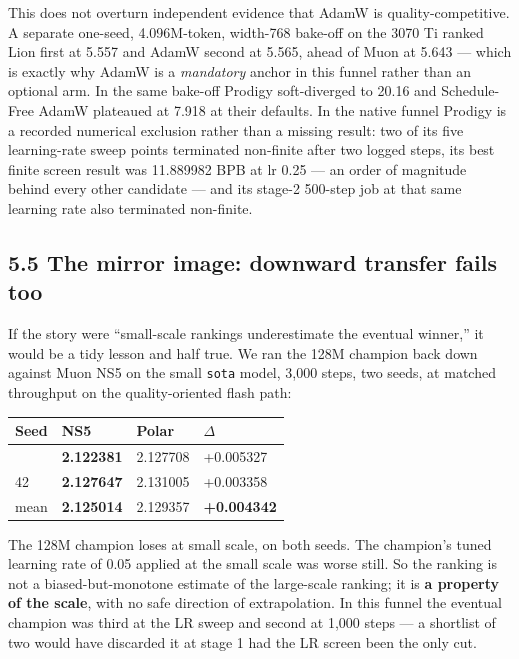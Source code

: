 This does not overturn independent evidence that AdamW is quality-competitive. A separate
one-seed, 4.096M-token, width-768 bake-off on the 3070 Ti ranked Lion first at 5.557 and AdamW
second at 5.565, ahead of Muon at 5.643 --- which is exactly why AdamW is a \emph{mandatory} anchor in
this funnel rather than an optional arm. In the same bake-off Prodigy soft-diverged to 20.16 and
Schedule-Free AdamW plateaued at 7.918 at their defaults. In the native funnel Prodigy is a
recorded numerical exclusion rather than a missing result: two of its five learning-rate sweep
points terminated non-finite after two logged steps, its best finite screen result was 11.889982
BPB at lr 0.25 --- an order of magnitude behind every other candidate --- and its stage-2 500-step job
at that same learning rate also terminated non-finite.

\subsection{5.5 The mirror image: downward transfer fails too}\label{the-mirror-image-downward-transfer-fails-too}

If the story were ``small-scale rankings underestimate the eventual winner,'' it would be a tidy
lesson and half true. We ran the 128M champion back down against Muon NS5 on the small \texttt{sota}
model, 3,000 steps, two seeds, at matched throughput on the quality-oriented flash path:

{%
{\small\begin{longtable}[]{@{}llll@{}}
\toprule\noalign{}
Seed & NS5 & Polar & $\Delta$ \\
\midrule\noalign{}
\endhead
\bottomrule\noalign{}
\endlastfoot
1337 & \textbf{2.122381} & 2.127708 & +0.005327 \\
42 & \textbf{2.127647} & 2.131005 & +0.003358 \\
mean & \textbf{2.125014} & 2.129357 & \textbf{+0.004342} \\
\end{longtable}}
}

The 128M champion loses at small scale, on both seeds. The champion's tuned learning rate of 0.05
applied at the small scale was worse still. So the ranking is not a biased-but-monotone estimate of
the large-scale ranking; it is \textbf{a property of the scale}, with no safe direction of
extrapolation. In this funnel the eventual champion was third at the LR sweep and second at 1,000
steps --- a shortlist of two would have discarded it at stage 1 had the LR screen been the only cut.

